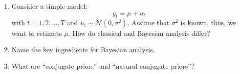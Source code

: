 \begin{enumerate}
    \item Consider a simple model:
          $$y_t = \mu + u_t$$
          with $t = 1, 2,..., T$ and $u_t \sim \mathcal{N}(0,\sigma^2)$. Assume that $\sigma^2$ is known, thus, we want to estimate $\mu$. How do classical and Bayesian analysis differ?

    \item Name the key ingredients for Bayesian analysis.

    \item What are \enquote{conjugate priors} and \enquote{natural conjugate priors}?
\end{enumerate}